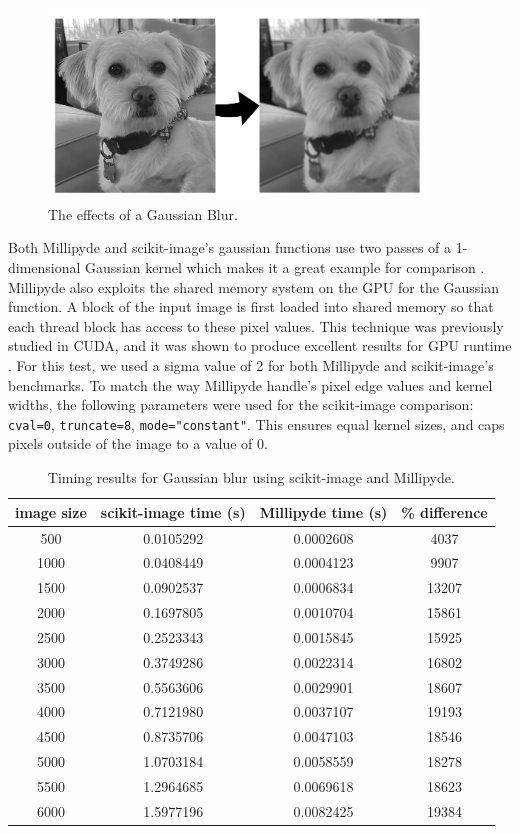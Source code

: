 \begin{figure}[H]
\includegraphics[width=100mm]{figures/GaussianExample2.png}
\centering
\caption{The effects of a Gaussian Blur.}
\label{augmentExample}
\end{figure}

\quad Both Millipyde and scikit-image's gaussian functions use two passes of a 1-dimensional Gaussian kernel which makes it a great example for comparison \cite{scipyGaussianSrc}. Millipyde also exploits the shared memory system on the GPU for the Gaussian function. A block of the input image is first loaded into shared memory so that each thread block has access to these pixel values. This technique was previously studied in CUDA, and it was shown to produce excellent results for GPU runtime \cite{cudaConvolution}. For this test, we used a sigma value of 2 for both Millipyde and scikit-image's benchmarks. To match the way Millipyde handle's pixel edge values and kernel widths, the following parameters were used for the scikit-image comparison:
\verb|cval=0|, \verb|truncate=8|, \verb|mode="constant"|. This ensures equal kernel sizes, and caps pixels outside of the image to a value of 0.


\begin{table}[H]
\centering
\begin{tabular}{ |c|c|c|c| } 
\hline
image size & scikit-image time (s) & Millipyde time (s) & \% difference \\
\hline
500&0.0105292&0.0002608&4037 \\
1000&0.0408449&0.0004123&9907 \\
1500&0.0902537&0.0006834&13207 \\
2000&0.1697805&0.0010704&15861 \\
2500&0.2523343&0.0015845&15925 \\
3000&0.3749286&0.0022314&16802 \\
3500&0.5563606&0.0029901&18607 \\
4000&0.7121980&0.0037107&19193 \\
4500&0.8735706&0.0047103&18546 \\
5000&1.0703184&0.0058559&18278 \\
5500&1.2964685&0.0069618&18623 \\
6000&1.5977196&0.0082425&19384 \\
\hline
\end{tabular}
\caption{Timing results for Gaussian blur using scikit-image and Millipyde.}
\label{gaussianTable}
\end{table}

